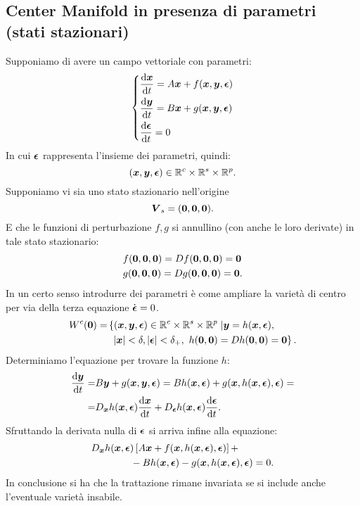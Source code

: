 \subsection{Center Manifold in presenza di parametri (stati stazionari)}%
Supponiamo di avere un campo vettoriale con parametri:
\[
\begin{dcases}
    \frac{\text{d} \boldsymbol{x}}{\text{d} t} = A\boldsymbol{x} + f(\boldsymbol{x}, \boldsymbol{y}, \boldsymbol{\epsilon}) \\
    \frac{\text{d} \boldsymbol{y}}{\text{d} t} = B\boldsymbol{x} + g(\boldsymbol{x}, \boldsymbol{y}, \boldsymbol{\epsilon}) \\
    \frac{\text{d} \boldsymbol{\epsilon}}{\text{d} t} = 0
\end{dcases}
\]
In cui $\boldsymbol{\epsilon}$  rappresenta l'insieme dei parametri, quindi:
\[
    (\boldsymbol{x}, \boldsymbol{y}, \boldsymbol{\epsilon}) \in \mathbb{R}^c \times \mathbb{R}^s \times \mathbb{R}^p
.\] 
Supponiamo vi sia uno stato stazionario nell'origine
\[
    \boldsymbol{V}_s = (\boldsymbol{0}, \boldsymbol{0}, \boldsymbol{0}) 
.\] 
E che le funzioni di perturbazione $f, g$  si annullino (con anche le loro derivate) in tale stato stazionario:
\[\begin{aligned}
    &f(\boldsymbol{0}, \boldsymbol{0}, \boldsymbol{0}) = Df(\boldsymbol{0}, \boldsymbol{0}, \boldsymbol{0}) = \boldsymbol{0}\\
    &g(\boldsymbol{0}, \boldsymbol{0}, \boldsymbol{0}) = Dg(\boldsymbol{0}, \boldsymbol{0}, \boldsymbol{0}) = \boldsymbol{0}
.\end{aligned}\]
In un certo senso introdurre dei parametri è come ampliare la varietà di centro per via della terza equazione $\dot{\boldsymbol{\epsilon}} = 0$.
\[\begin{aligned}
    W^c(\boldsymbol{0}) = &\left\{(\boldsymbol{x}, \boldsymbol{y}, \boldsymbol{\epsilon}) \in \mathbb{R}^c \times \mathbb{R}^s \times \mathbb{R}^p\right.| \boldsymbol{y}=h(\boldsymbol{x},\boldsymbol{\epsilon}),\\
		 &\left.  \ \left|\boldsymbol{x}\right|<\delta, \left|\boldsymbol{\epsilon}\right|<\delta_+, \ h(\boldsymbol{0}, \boldsymbol{0}) = Dh(\boldsymbol{0}, \boldsymbol{0}) = \boldsymbol{0} \right\}
.\end{aligned}\]
Determiniamo l'equazione per trovare la funzione $h$:
\[\begin{aligned}
    \frac{\text{d} \boldsymbol{y}}{\text{d} t} =& B\boldsymbol{y}+g(\boldsymbol{x}, \boldsymbol{y}, \boldsymbol{\epsilon}) = 
    Bh(\boldsymbol{x}, \boldsymbol{\epsilon}) + g(\boldsymbol{x}, h(\boldsymbol{x}, \boldsymbol{\epsilon}), \boldsymbol{\epsilon}) =\\
    = & D_{\boldsymbol{x}}h(\boldsymbol{x}, \boldsymbol{\epsilon}) \frac{\text{d} \boldsymbol{x}}{\text{d} t} +
    D_{\boldsymbol{\epsilon}}h(\boldsymbol{x}, \boldsymbol{\epsilon}) \frac{\text{d} \boldsymbol{\epsilon}}{\text{d} t}
.\end{aligned}\]
Sfruttando la derivata nulla di $\boldsymbol{\epsilon}$ si arriva infine alla equazione:
\[\begin{aligned}
     &D_{\boldsymbol{x}}h(\boldsymbol{x}, \boldsymbol{\epsilon}) \left[A\boldsymbol{x} + f(\boldsymbol{x}, h(\boldsymbol{x}, \boldsymbol{\epsilon }), \boldsymbol{\epsilon}) \right] +\\
     & \qquad  \qquad  -Bh(\boldsymbol{x}, \boldsymbol{\epsilon}) - g(\boldsymbol{x}, h(\boldsymbol{x}, \boldsymbol{\epsilon}), \boldsymbol{\epsilon}) = 0
.\end{aligned}\]
In conclusione si ha che la trattazione rimane invariata se si include anche l'eventuale varietà insabile.

